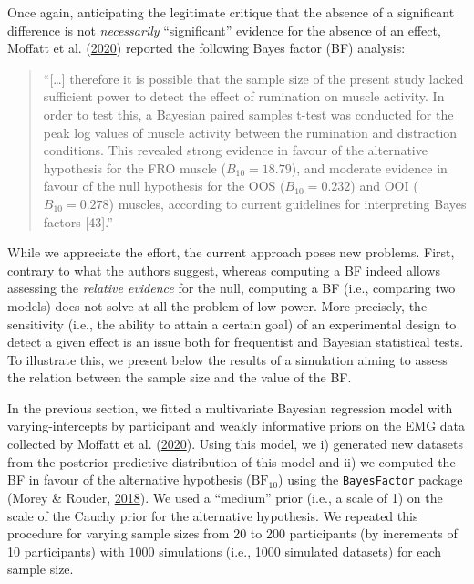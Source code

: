 \documentclass[
  english,
  man, donotrepeattitle,floatsintext]{apa6}
\begin{document}
Once again, anticipating the legitimate critique that the absence of a significant difference is not \emph{necessarily} ``significant'' evidence for the absence of an effect, Moffatt et al. (\protect\hyperlink{ref-moffatt_inner_2020}{2020}) reported the following Bayes factor (BF) analysis:

\begin{quote}
``{[}\ldots{]} therefore it is possible that the sample size of the present study lacked sufficient power to detect the effect of rumination on muscle activity. In order to test this, a Bayesian paired samples t-test was conducted for the peak log values of muscle activity between the rumination and distraction conditions. This revealed strong evidence in favour of the alternative hypothesis for the FRO muscle (\(B_{10} = 18.79\)), and moderate evidence in favour of the null hypothesis for the OOS (\(B_{10} = 0.232\)) and OOI (\(B_{10} = 0.278\)) muscles, according to current guidelines for interpreting Bayes factors {[}43{]}.''
\end{quote}

While we appreciate the effort, the current approach poses new problems. First, contrary to what the authors suggest, whereas computing a BF indeed allows assessing the \emph{relative evidence} for the null, computing a BF (i.e., comparing two models) does not solve at all the problem of low power. More precisely, the sensitivity (i.e., the ability to attain a certain goal) of an experimental design to detect a given effect is an issue both for frequentist and Bayesian statistical tests. To illustrate this, we present below the results of a simulation aiming to assess the relation between the sample size and the value of the BF.

In the previous section, we fitted a multivariate Bayesian regression model with varying-intercepts by participant and weakly informative priors on the EMG data collected by Moffatt et al. (\protect\hyperlink{ref-moffatt_inner_2020}{2020}). Using this model, we i) generated new datasets from the posterior predictive distribution of this model and ii) we computed the BF in favour of the alternative hypothesis (\(\text{BF}_{10}\)) using the \texttt{BayesFactor} package (Morey \& Rouder, \protect\hyperlink{ref-R-BayesFactor}{2018}). We used a ``medium'' prior (i.e., a scale of 1) on the scale of the Cauchy prior for the alternative hypothesis. We repeated this procedure for varying sample sizes from 20 to 200 participants (by increments of 10 participants) with \(1000\) simulations (i.e., 1000 simulated datasets) for each sample size.
\end{document}
